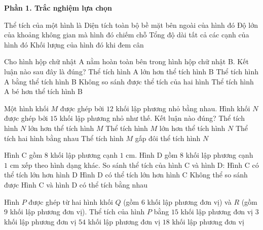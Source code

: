 \textbf{Phần 1. Trắc nghiệm lựa chọn}

\begin{ex} %
Thể tích của một hình là
\choice
{Diện tích toàn bộ bề mặt bên ngoài của hình đó}
{\True Độ lớn của khoảng không gian mà hình đó chiếm chỗ}
{Tổng độ dài tất cả các cạnh của hình đó}
{Khối lượng của hình đó khi đem cân}
\end{ex}

\begin{ex} %
Cho hình hộp chữ nhật A nằm hoàn toàn bên trong hình hộp chữ nhật B. Kết luận nào sau đây là đúng?
\choice
{Thể tích hình A lớn hơn thể tích hình B}
{Thể tích hình A bằng thể tích hình B}
{Không so sánh được thể tích của hai hình}
{\True Thể tích hình A bé hơn thể tích hình B}
\end{ex}

\begin{ex} %
Một hình khối $M$ được ghép bởi $12$ khối lập phương nhỏ bằng nhau. Hình khối $N$ được ghép bởi $15$ khối lập phương nhỏ như thế. Kết luận nào đúng?
\choice
{\True Thể tích hình $N$ lớn hơn thể tích hình $M$}
{Thể tích hình $M$ lớn hơn thể tích hình $N$}
{Thể tích hai hình bằng nhau}
{Thể tích hình $M$ gấp đôi thể tích hình $N$}
\end{ex}

\begin{ex} %
Hình C gồm $8$ khối lập phương cạnh $1\text{ cm}$. Hình D gồm $8$ khối lập phương cạnh $1\text{ cm}$ xếp theo hình dạng khác. So sánh thể tích của hình C và hình D:
\choice
{Hình C có thể tích lớn hơn hình D}
{Hình D có thể tích lớn hơn hình C}
{Không thể so sánh được}
{\True Hình C và hình D có thể tích bằng nhau}
\end{ex}

\begin{ex} %
Hình $P$ được ghép từ hai hình khối $Q$ (gồm $6$ khối lập phương đơn vị) và $R$ (gồm $9$ khối lập phương đơn vị). Thể tích của hình $P$ bằng
\choice
{\True $15$ khối lập phương đơn vị}
{$3$ khối lập phương đơn vị}
{$54$ khối lập phương đơn vị}
{$18$ khối lập phương đơn vị}
\end{ex}

